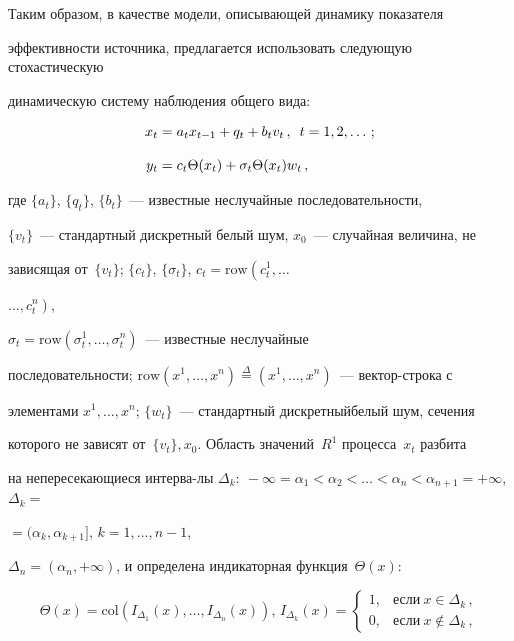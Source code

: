       


      Таким образом, в качестве модели, описывающей динамику показателя 


эффективности источника, предлагается использовать следующую стохастическую 


динамическую систему наблюдения общего вида:


\begin{align*}


x_t & = a_t x_{t-1}+q_t+b_t v_t\,, \enskip t=1,2,\ldots \,;\\[9pt]


y_t &= c_t\Theta (x_t)+\sigma_t\Theta(x_t)w_t\,,


\end{align*}


где $\{a_t\}$, $\{q_t\}$, $\{b_t\}$~--- известные неслучайные последовательности, 


$\{v_t\}$~--- стандартный дискретный белый шум, $x_0$~--- случайная величина, не 


зависящая от~$\{v_t\}$; $\{c_t\}$, $\{\sigma_t\}$, $c_t=\mathrm{row}\left(c_t^1,\ldots\right.$\linebreak 


$\left.\ldots , c_t^n\right)$, 


$\sigma_t=\mathrm{row}\left(\sigma_t^1,\ldots ,\sigma_t^n\right)$~--- известные неслучайные 


последовательности; $\mathrm{row}(x^1,\ldots ,x^n)\overset{\Delta}{=} (x^1, \ldots , x^n)$~--- вектор-строка с 


элементами $x^1,\ldots , x^n$;  $\{w_t\}$~--- стандартный дискретный\linebreak белый шум, сечения 


которого не зависят от~$\{v_t\}, x_0$. Область значений~$R^1$ процесса~$x_t$ разбита 


на непересекающиеся интерва-\linebreak лы $\Delta_k:\ -\infty =\alpha_1<\alpha_2<\ldots < 


\alpha_n<\alpha_{n+1}=+\infty$, $\Delta_k=$\linebreak


$= (\alpha_k, \alpha_{k+1}]$, $k=1,\ldots , n-1$, 


$\Delta_n=(\alpha_n,+\infty)$, и определена индикаторная функция~$\Theta(x)$:


\begin{equation}


\!\Theta(x) =\mathrm{col}\left(I_{\Delta_1}(x),\ldots , I_{\Delta_n}(x)\right),\,I_{\Delta_k}(x)=


\begin{cases}


1, & \mbox{если}\ x\in \Delta_k\,,\\


0, & \mbox{если}\ x\notin \Delta_k\,,


\end{cases}\!


\label{e5-8}


\end{equation}


